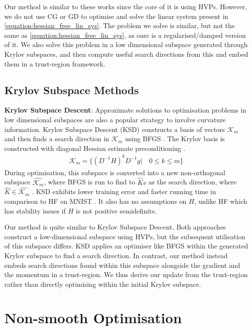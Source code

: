 Our method is similar to these works since the core of it is using HVPs. However, we do not use CG or GD to optimise and solve the linear system present in \cref{equation:hessian_free_lin_sys}. The problem we solve is similar, but not the same as \cref{equation:hessian_free_lin_sys}, as ours is a regularised/damped version of it. We also solve this problem in a low dimensional subspace generated through Krylov subspaces, and then compute useful search directions from this and embed them in a trust-region framework.

\subsection{Krylov Subspace Methods}
\label{ssec:krylov_subspace_methods}

\textbf{Krylov Subspace Descent}: Approximate solutions to optimisation problems in low dimensional subspaces are also a popular strategy to involve curvature information. Krylov Subspace Descent (KSD) constructs a basis of vectors $\mathcal{K}_m$ and then finds a search direction in $\mathcal{K}_m$ using BFGS \citep{vinyals2012krylov}. The Krylov basis is constructed with diagonal Hessian estimate preconditioning \citep{vinyals2012krylov}.
\begin{align}
    \mathcal{K}_m = \{(D^{-1}H)^{k}D^{-1}g | \quad 0 \leq k \leq m \}
\end{align}
During optimisation, this subspace is converted into a new non-orthogonal subspace $\hat{\mathcal{K}_m}$, where BFGS is run to find to ${\hat{K}v}$ as the search direction, where $\hat{K} \in \hat{\mathcal{K}_m}$ \citep{vinyals2012krylov}. KSD exhibits lower training error and faster running time in comparison to HF on MNIST \citep{vinyals2012krylov}. It also has no assumptions on $H$, unlike HF which has stability issues if $H$ is not positive semidefinite.

Our method is quite similar to Krylov Subspace Descent. Both approaches construct a low-dimensional subspace using HVPs, but the subsequent utilisation of this subspace differs. KSD applies an optimiser like BFGS within the generated Krylov subspace to find a search direction. In contrast, our method instead embeds search directions found within this subspace alongside the gradient and the momentum in a trust-region. We thus derive our update from the trust-region rather than directly optimising within the initial Krylov subspace.  

\section{Non-smooth Optimisation}
\label{sec:non_smooth_optimisation}

